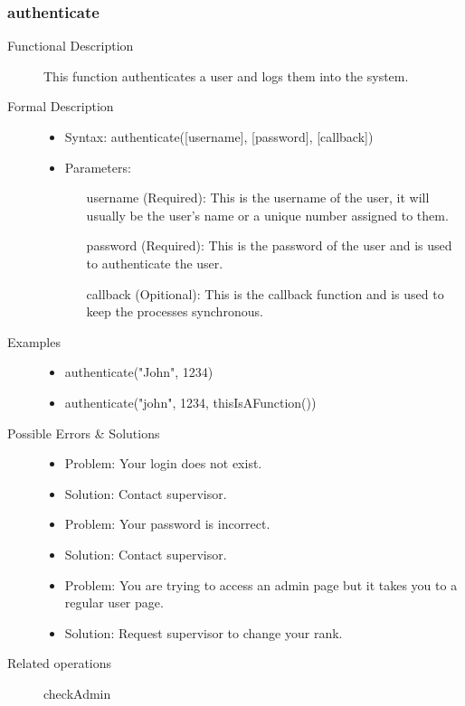 \documentclass[14pt, a4paper]{article}
\begin{document}
\subsubsection{authenticate} 
\begin{description}
\item[Functional Description] This function authenticates a user and logs them into the system.
\item[Formal Description]\hfill
\begin{itemize}
	\item Syntax: authenticate([username], [password], [callback])\\
	\item Parameters:
		\begin{itemize}
			\item [username] (Required): This is the username of the user, it will usually be the user's name or a unique number assigned to them.
			\item [password] (Required): This is the password of the user and is used to authenticate the user.
			\item [callback](Opitional): This is the callback function and is used to keep the processes synchronous.
		\end{itemize}
\end{itemize}
\item[Examples]\hfill
\begin{itemize}
	\item authenticate("John", 1234)
	\item authenticate("john", 1234, thisIsAFunction(){})
\end{itemize}
\item[Possible Errors \&  Solutions]\hfill
	\begin{itemize}
		\item Problem: Your login does not exist.
		\item Solution: Contact supervisor.
		\item Problem: Your password is incorrect.
		\item Solution: Contact supervisor.
		\item Problem: You are trying to access an admin page but it takes you to a regular user page.
		\item Solution: Request supervisor to change your rank.
	\end{itemize}
\item [Related operations]	checkAdmin
\end{description}
\end{document}
